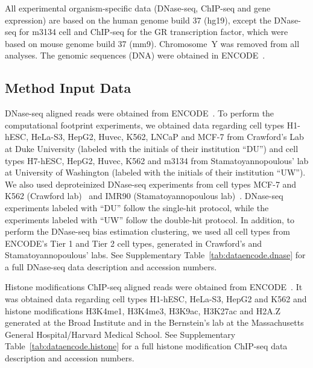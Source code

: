 All experimental organism-specific data (DNase-seq, ChIP-seq and gene expression) are based on the human genome build 37 (hg19), except the DNase-seq for m3134 cell and ChIP-seq for the GR transcription factor, which were based on mouse genome build 37 (mm9). Chromosome~Y was removed from all analyses. The genomic sequences (DNA) were obtained in ENCODE~\cite{encode2012}.

\subsection{Method Input Data}
\label{sec:method.input.data}

DNase-seq aligned reads were obtained from ENCODE~\cite{encode2012}. To perform the computational footprint experiments, we obtained data regarding cell types H1-hESC, HeLa-S3, HepG2, Huvec, K562, LNCaP and MCF-7 from Crawford's Lab at Duke University (labeled with the initials of their institution ``DU'') and cell types H7-hESC, HepG2, Huvec, K562 and m3134 from Stamatoyannopoulous' lab at University of Washington (labeled with the initials of their institution ``UW''). We also used deproteinized DNase-seq experiments from cell types MCF-7 and K562 (Crawford lab)~\cite{yardimci2014} and IMR90 (Stamatoyannopoulous lab)~\cite{lazarovici2013}. DNase-seq experiments labeled with ``DU'' follow the single-hit protocol, while the experiments labeled with ``UW'' follow the double-hit protocol. In addition, to perform the DNase-seq bias estimation clustering, we used all cell types from ENCODE's Tier 1 and Tier 2 cell types, generated in Crawford's and Stamatoyannopoulous' labs. See Supplementary Table~\ref{tab:dataencode.dnase} for a full DNase-seq data description and accession numbers.

Histone modifications ChIP-seq aligned reads were obtained from ENCODE~\cite{encode2012}. It was obtained data regarding cell types H1-hESC, HeLa-S3, HepG2 and K562 and histone modifications H3K4me1, H3K4me3, H3K9ac, H3K27ac and H2A.Z generated at the Broad Institute and in the Bernstein's lab at the Massachusetts General Hospital/Harvard Medical School. See Supplementary Table~\ref{tab:dataencode.histone} for a full histone modification ChIP-seq data description and accession numbers.

